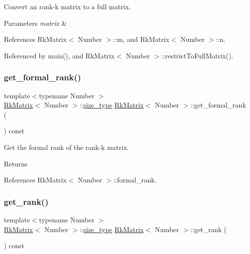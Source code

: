 Convert an rank-\/k matrix to a full matrix. 
\begin{DoxyParams}{Parameters}
{\em matrix} & \\
\hline
\end{DoxyParams}


References Rk\+Matrix$<$ Number $>$\+::m, and Rk\+Matrix$<$ Number $>$\+::n.



Referenced by main(), and Rk\+Matrix$<$ Number $>$\+::restrict\+To\+Full\+Matrix().

\mbox{\label{classRkMatrix_ae69122e3ee1c49a4fbe48cf3d7a20581}} 
\subsubsection{\texorpdfstring{get\+\_\+formal\+\_\+rank()}{get\_formal\_rank()}}
{\footnotesize\ttfamily template$<$typename Number $>$ \\
\hyperlink{classRkMatrix}{Rk\+Matrix}$<$ Number $>$\+::\hyperlink{classRkMatrix_add060bfc3a4cc77f858c3d6dd58cadd5}{size\+\_\+type} \hyperlink{classRkMatrix}{Rk\+Matrix}$<$ Number $>$\+::get\+\_\+formal\+\_\+rank (\begin{DoxyParamCaption}{ }\end{DoxyParamCaption}) const}

Get the formal rank of the rank-\/k matrix. \begin{DoxyReturn}{Returns}

\end{DoxyReturn}


References Rk\+Matrix$<$ Number $>$\+::formal\+\_\+rank.

\mbox{\label{classRkMatrix_a1b2231c1e02862c91f4451e2b0a5fab4}} 
\subsubsection{\texorpdfstring{get\+\_\+rank()}{get\_rank()}}
{\footnotesize\ttfamily template$<$typename Number $>$ \\
\hyperlink{classRkMatrix}{Rk\+Matrix}$<$ Number $>$\+::\hyperlink{classRkMatrix_add060bfc3a4cc77f858c3d6dd58cadd5}{size\+\_\+type} \hyperlink{classRkMatrix}{Rk\+Matrix}$<$ Number $>$\+::get\+\_\+rank (\begin{DoxyParamCaption}{ }\end{DoxyParamCaption}) const}

